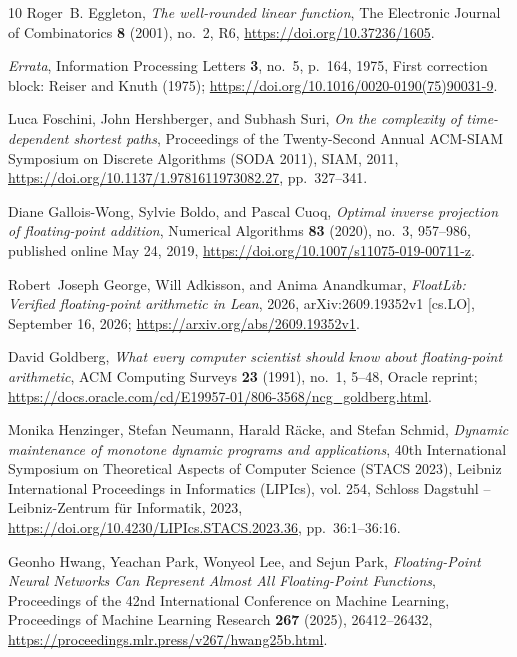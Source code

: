 \documentclass[11pt,reqno]{amsart}
\theoremstyle{definition}
\theoremstyle{remark}
\numberwithin{equation}{section}
\begin{document}
\begin{thebibliography}{10}
Roger~B. Eggleton, \emph{The well-rounded linear function}, The Electronic
  Journal of Combinatorics \textbf{8} (2001), no.~2, R6,
  \url{https://doi.org/10.37236/1605}.

\emph{Errata}, Information Processing Letters \textbf{3}, no.~5, p.~164, 1975,
  First correction block: {Reiser and Knuth} (1975);
  \url{https://doi.org/10.1016/0020-0190(75)90031-9}.

Luca Foschini, John Hershberger, and Subhash Suri, \emph{On the complexity of
  time-dependent shortest paths}, Proceedings of the Twenty-Second Annual
  {ACM-SIAM} Symposium on Discrete Algorithms ({SODA} 2011), SIAM, 2011,
  \url{https://doi.org/10.1137/1.9781611973082.27}, pp.~327--341.

Diane Gallois-Wong, Sylvie Boldo, and Pascal Cuoq,
  \emph{Optimal inverse projection of floating-point addition},
  Numerical Algorithms \textbf{83} (2020), no.~3, 957--986,
  published online May 24, 2019,
  \url{https://doi.org/10.1007/s11075-019-00711-z}.

Robert~Joseph George, Will Adkisson, and Anima Anandkumar, \emph{{FloatLib}:
  Verified floating-point arithmetic in {Lean}}, 2026, arXiv:2609.19352v1
  [cs.LO], September 16, 2026; \url{https://arxiv.org/abs/2609.19352v1}.

David Goldberg, \emph{What every computer scientist should know about
  floating-point arithmetic}, ACM Computing Surveys \textbf{23} (1991), no.~1,
  5--48, {Oracle} reprint;
  \url{https://docs.oracle.com/cd/E19957-01/806-3568/ncg_goldberg.html}.

Monika Henzinger, Stefan Neumann, Harald R{\"a}cke, and Stefan Schmid,
  \emph{Dynamic maintenance of monotone dynamic programs and applications},
  40th International Symposium on Theoretical Aspects of Computer Science
  (STACS 2023), Leibniz International Proceedings in Informatics (LIPIcs), vol.
  254, Schloss Dagstuhl -- Leibniz-Zentrum f{\"u}r Informatik, 2023,
  \url{https://doi.org/10.4230/LIPIcs.STACS.2023.36}, pp.~36:1--36:16.

Geonho Hwang, Yeachan Park, Wonyeol Lee, and Sejun Park,
\emph{Floating-Point Neural Networks Can Represent Almost All Floating-Point
Functions}, Proceedings of the 42nd International Conference on Machine
Learning, Proceedings of Machine Learning Research \textbf{267} (2025),
26412--26432, \url{https://proceedings.mlr.press/v267/hwang25b.html}.


\end{thebibliography}
\end{document}
